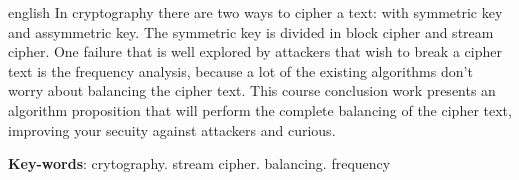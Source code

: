 \begin{resumo}[Abstract]
 \begin{otherlanguage*}{english}
	In cryptography there are two ways to cipher a text: with symmetric key and assymmetric key. The symmetric key is divided in  block cipher and stream cipher. One failure that is well explored by attackers that wish to break a cipher text is the frequency analysis, because a lot of the existing algorithms don't worry about balancing the cipher text. This course conclusion work presents an algorithm proposition that will perform the complete balancing of the cipher text, improving your secuity against attackers and curious. 
   \vspace{\onelineskip}
 
   \noindent 
   \textbf{Key-words}: crytography. stream cipher. balancing. frequency
 \end{otherlanguage*}
\end{resumo}

